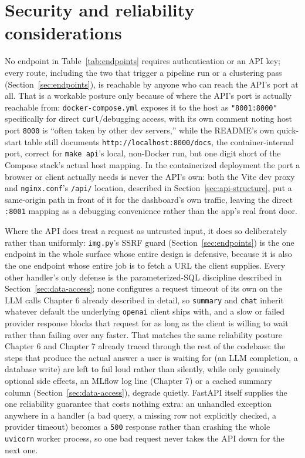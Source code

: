 \section{Security and reliability considerations}
\label{sec:backend-security}
\begin{sloppypar}
No endpoint in Table~\ref{tab:endpoints} requires authentication or an API key; every route, including the two that trigger a pipeline run or a clustering pass (Section~\ref{sec:endpoints}), is reachable by anyone who can reach the API's port at all. That is a workable posture only because of where the API's port is actually reachable from: \texttt{docker-compose.yml} exposes it to the host as \texttt{"8001:8000"} specifically for direct \texttt{curl}/debugging access, with its own comment noting host port \texttt{8000} is ``often taken by other dev servers,'' while the README's own quick-start table still documents \texttt{http://localhost:8000/docs}, the container-internal port, correct for \texttt{make api}'s local, non-Docker run, but one digit short of the Compose stack's actual host mapping. In the containerized deployment the port a browser or client actually needs is never the API's own: both the Vite dev proxy and \texttt{nginx.conf}'s \texttt{/api/} location, described in Section~\ref{sec:api-structure}, put a same-origin path in front of it for the dashboard's own traffic, leaving the direct \texttt{:8001} mapping as a debugging convenience rather than the app's real front door.
\end{sloppypar}

\begin{sloppypar}
Where the API does treat a request as untrusted input, it does so deliberately rather than uniformly: \texttt{img.py}'s SSRF guard (Section~\ref{sec:endpoints}) is the one endpoint in the whole surface whose entire design is defensive, because it is also the one endpoint whose entire job is to fetch a URL the client supplies. Every other handler's only defense is the parameterized-SQL discipline described in Section~\ref{sec:data-access}; none configures a request timeout of its own on the LLM calls Chapter 6 already described in detail, so \texttt{summary} and \texttt{chat} inherit whatever default the underlying \texttt{openai} client ships with, and a slow or failed provider response blocks that request for as long as the client is willing to wait rather than failing over any faster. That matches the same reliability posture Chapter 6 and Chapter 7 already traced through the rest of the codebase: the steps that produce the actual answer a user is waiting for (an LLM completion, a database write) are left to fail loud rather than silently, while only genuinely optional side effects, an MLflow log line (Chapter 7) or a cached summary column (Section~\ref{sec:data-access}), degrade quietly. FastAPI itself supplies the one reliability guarantee that costs nothing extra: an unhandled exception anywhere in a handler (a bad query, a missing row not explicitly checked, a provider timeout) becomes a \texttt{500} response rather than crashing the whole \texttt{uvicorn} worker process, so one bad request never takes the API down for the next one.
\end{sloppypar}

